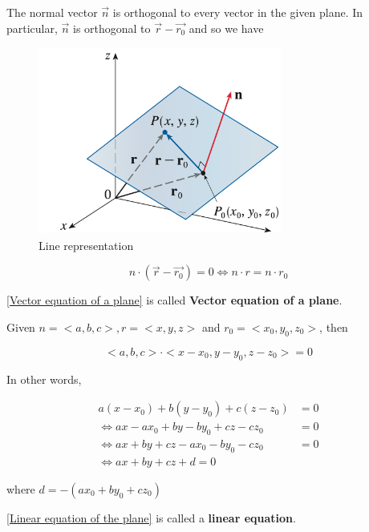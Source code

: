The normal vector $\vec{n}$ is orthogonal to every vector in the given plane. In particular, $\vec{n}$ is orthogonal to $\vec{r} - \vec{r_0}$ and so we have

\begin{figure}
    \centering
    \includegraphics[width=8cm]{appendices/figures/fig005}
    \caption{Line representation}
\end{figure}

\begin{equation}
    \label{Vector equation of a plane}
    n \cdot (\vec{r} - \vec{r_0}) = 0 \Leftrightarrow n \cdot r = n \cdot r_0
\end{equation}

\ref{Vector equation of a plane} is called \textbf{Vector equation of a plane}.

Given $n = <a, b, c>, r = <x, y, z>$ and $r_0 = <x_0, y_0, z_0>$, then

\begin{equation}
    <a, b, c> \cdot <x - x_0, y - y_0, z - z_0> = 0
\end{equation}

In other words,

\begin{equation}
    \label{Linear equation of the plane}
    \begin{split}
        a(x - x_0) + b(y - y_0) + c(z - z_0) & = 0\\
        \Leftrightarrow ax - ax_0 + by - by_0 + cz - cz_0 & = 0\\
        \Leftrightarrow ax + by + cz - ax_0 - by_0 - cz_0 & = 0\\
        \Leftrightarrow ax + by + cz + d = 0
    \end{split}
\end{equation}

where $d = -(ax_0 + by_0 + cz_0)$ 

\ref{Linear equation of the plane} is called a \textbf{linear equation}.


